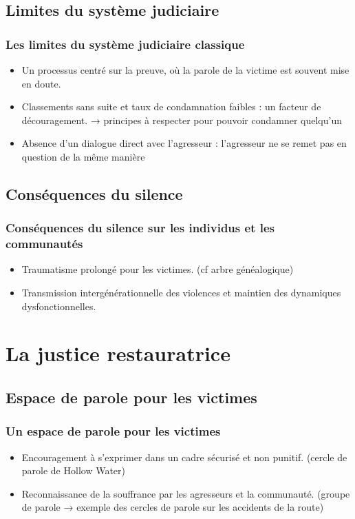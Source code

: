 \documentclass[french]{beamer}
\begin{document}
\subsection{Limites du système judiciaire}
\begin{frame}
  \frametitle{Les limites du système judiciaire classique}
  \begin{itemize}
    \item Un processus centré sur la preuve, où la parole de la victime est souvent mise en doute.
    \item Classements sans suite et taux de condamnation faibles : un facteur de découragement. → principes à respecter pour pouvoir condamner quelqu’un
    \item Absence d’un dialogue direct avec l’agresseur : l’agresseur ne se remet pas en question de la même manière
  \end{itemize}
\end{frame}

\subsection{Conséquences du silence}
\begin{frame}
  \frametitle{Conséquences du silence sur les individus et les communautés}
  \begin{itemize}
    \item Traumatisme prolongé pour les victimes. (cf arbre généalogique)
    \item Transmission intergénérationnelle des violences et maintien des dynamiques dysfonctionnelles.
  \end{itemize}
\end{frame}

\section{La justice restauratrice}
\subsection{Espace de parole pour les victimes}
\begin{frame}
  \frametitle{Un espace de parole pour les victimes}
  \begin{itemize}
    \item Encouragement à s’exprimer dans un cadre sécurisé et non punitif. (cercle de parole de Hollow Water)
    \item Reconnaissance de la souffrance par les agresseurs et la communauté. (groupe de parole → exemple des cercles de parole sur les accidents de la route)
  \end{itemize}
\end{frame}
\end{document}

